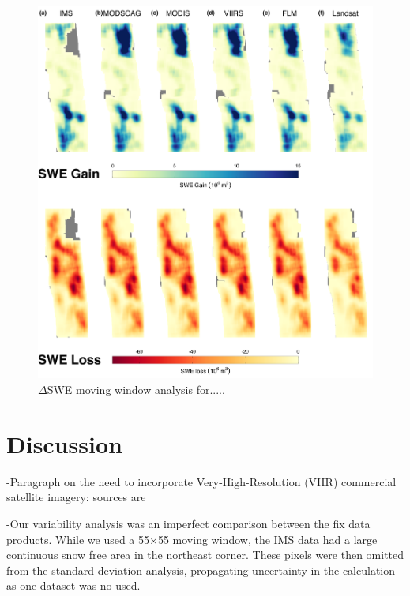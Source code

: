 \clearpage
\begin{figure}[t]
\centering
\includegraphics[width=\textwidth]{figures/ch4_figs/dswe_mw_full_v2.png}
\centering
\caption{$\Delta$SWE moving window analysis for.....}
\end{figure}




\hypertarget{ch5-discussion}{\section{Discussion}\label{ch4-discussion}}

-Paragraph on the need to incorporate Very-High-Resolution (VHR) commercial satellite imagery: sources are \citep{huImprovingMountainSnow2022, thalerEstimatingSnowCover2023,yangHighresolutionMappingSnow2023,johnHighResolutionSnowCoveredArea2022}


-Our variability analysis was an imperfect comparison between the fix data products. While we used a 55$\times$55 moving window, the IMS data had a large continuous snow free area in the northeast corner. These pixels were then omitted from the standard deviation analysis, propagating uncertainty in the calculation as one dataset was no used.


